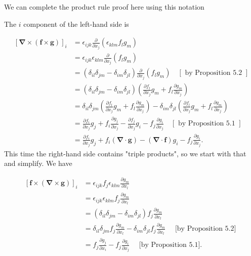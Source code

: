 \begin{remark}
  We can complete the product rule proof here using this notation

The \(i\) component of the left-hand side is

\[
\begin{aligned}
{[\boldsymbol{\nabla} \times(\boldsymbol{f} \times \boldsymbol{g})]_i } & =\epsilon_{i j k} \frac{\partial}{\partial x_j}\left(\epsilon_{k l m} f_l g_m\right) \\
& =\epsilon_{i j k} \epsilon_{k l m} \frac{\partial}{\partial x_j}\left(f_l g_m\right) \\
& =\left(\delta_{i l} \delta_{j m}-\delta_{i m} \delta_{j l}\right) \frac{\partial}{\partial x_j}\left(f_l g_m\right) \quad[\text { by Proposition 5.2 }] \\
& =\left(\delta_{i l} \delta_{j m}-\delta_{i m} \delta_{j l}\right)\left(\frac{\partial f_l}{\partial x_j} g_m+f_l \frac{\partial g_m}{\partial x_j}\right) \\
& =\delta_{i l} \delta_{j m}\left(\frac{\partial f_l}{\partial x_j} g_m+f_l \frac{\partial g_m}{\partial x_j}\right)-\delta_{i m} \delta_{j l}\left(\frac{\partial f_l}{\partial x_j} g_m+f_l \frac{\partial g_m}{\partial x_j}\right) \\
& =\frac{\partial f_i}{\partial x_j} g_j+f_i \frac{\partial g_j}{\partial x_j}-\frac{\partial f_j}{\partial x_j} g_i-f_j \frac{\partial g_i}{\partial x_j} \quad[\text { by Proposition 5.1 }] \\
& =\frac{\partial f_i}{\partial x_j} g_j+f_i(\boldsymbol{\nabla} \cdot \boldsymbol{g})-(\boldsymbol{\nabla} \cdot \boldsymbol{f}) g_i-f_j \frac{\partial g_i}{\partial x_j} .
\end{aligned}
\]
This time the right-hand side contains "triple products", so we start with that and simplify. We have

\[
\begin{aligned}
{[\boldsymbol{f} \times(\boldsymbol{\nabla} \times \boldsymbol{g})]_i } & =\epsilon_{i j k} f_j \epsilon_{k l m} \frac{\partial g_m}{\partial x_l} \\
& =\epsilon_{i j k} \epsilon_{k l m} f_j \frac{\partial g_m}{\partial x_l} \\
& =\left(\delta_{i l} \delta_{j m}-\delta_{i m} \delta_{j l}\right) f_j \frac{\partial g_m}{\partial x_l} \\
& =\delta_{i l} \delta_{j m} f_j \frac{\partial g_m}{\partial x_l}-\delta_{i m} \delta_{j l} f_j \frac{\partial g_m}{\partial x_l} \quad \text { [by Proposition 5.2] } \\
& =f_j \frac{\partial g_j}{\partial x_i}-f_j \frac{\partial g_i}{\partial x_j} \quad \text { [by Proposition 5.1]. }
\end{aligned}
\]


\end{remark}
